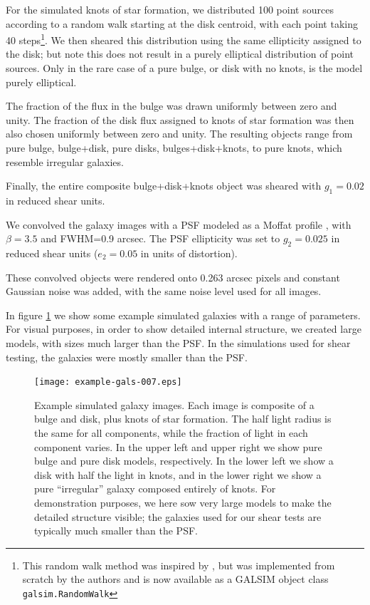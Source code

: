 \documentclass[a4paper,fleqn,usenatbib]{mnras}
\begin{document}
For the simulated knots of star formation, we distributed 100 point sources
according to a random walk starting at the disk centroid, with each point
taking 40 steps\footnote{This random walk method was inspired by
\cite{Zhang2008FourierQuadI}, but was implemented from scratch by the authors
and is now available as a GALSIM object class \texttt{galsim.RandomWalk}}.  We
then sheared this distribution using the same ellipticity assigned to the disk;
but note this does not result in a purely elliptical distribution of point
sources.  Only in the rare case of a pure bulge, or disk with no knots, is the
model purely elliptical.

The fraction of the flux in the bulge was drawn uniformly between zero and
unity.  The fraction of the disk flux assigned to knots of star formation
was then also chosen uniformly between zero and unity.  The resulting 
objects range from pure bulge, bulge+disk, pure disks, bulges+disk+knots, 
to pure knots, which resemble irregular galaxies.

Finally, the entire composite bulge+disk+knots object was sheared with
$g_1=0.02$ in reduced shear units.

We convolved the galaxy images with a PSF modeled as a Moffat profile
\citep{Moffat1969}, with $\beta=3.5$ and FWHM=0.9 arcsec. The PSF ellipticity was set to $g_2 = 0.025$ in reduced shear units ($e_2 =
0.05$ in units of distortion). 

These convolved objects were rendered onto 0.263 arcsec pixels and constant
Gaussian noise was added, with the same noise level used for all images.

In figure \ref{fig:parametricgals} we show some example simulated galaxies with
a range of parameters.  For visual purposes, in order to show detailed internal
structure, we created large models, with sizes much larger than the PSF.  In
the simulations used for shear testing, the galaxies were mostly smaller than
the PSF.


\begin{figure}
    \centering
    \texttt{[image: example-gals-007.eps]}

    \caption{Example simulated galaxy images.  Each image is composite of a
    bulge and disk, plus knots of star formation.  The half light radius is the
    same for all components, while the fraction of light in each component
    varies.  In the upper left and upper right we show pure bulge and pure disk
    models, respectively.  In the lower left we show a disk with half the light
    in knots, and in the lower right we show a pure ``irregular'' galaxy
    composed entirely of knots.  For demonstration purposes, we here sow very
    large models to make the detailed structure visible; the galaxies used for
    our shear tests are typically much smaller than the PSF. }

	\label{fig:parametricgals}

\end{figure}
\end{document}
